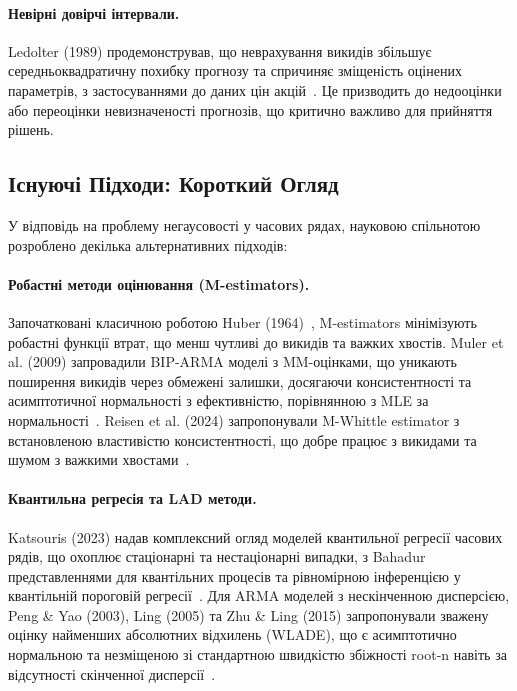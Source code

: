 \documentclass[12pt,a4paper]{article}
\begin{document}
	\paragraph{Невірні довірчі інтервали.} Ledolter (1989) продемонстрував, що неврахування викидів збільшує середньоквадратичну похибку прогнозу та спричиняє зміщеність оцінених параметрів, з застосуваннями до даних цін акцій~\cite{ledolter1989inference}. Це призводить до недооцінки або переоцінки невизначеності прогнозів, що критично важливо для прийняття рішень.
	
	\subsection{Існуючі Підходи: Короткий Огляд}
	\label{subsec:existing_approaches}
	
	У відповідь на проблему негаусовості у часових рядах, науковою спільнотою розроблено декілька альтернативних підходів:
	
	\paragraph{Робастні методи оцінювання (M-estimators).} Започатковані класичною роботою Huber (1964)~\cite{huber1964robust}, M-estimators мінімізують робастні функції втрат, що менш чутливі до викидів та важких хвостів. Muler et al. (2009) запровадили BIP-ARMA моделі з MM-оцінками, що уникають поширення викидів через обмежені залишки, досягаючи консистентності та асимптотичної нормальності з ефективністю, порівнянною з MLE за нормальності~\cite{muler2009robust}. Reisen et al. (2024) запропонували M-Whittle estimator з встановленою властивістю консистентності, що добре працює з викидами та шумом з важкими хвостами~\cite{reisen2024robust}.
	
	\paragraph{Квантильна регресія та LAD методи.} Katsouris (2023) надав комплексний огляд моделей квантильної регресії часових рядів, що охоплює стаціонарні та нестаціонарні випадки, з Bahadur представленнями для квантільних процесів та рівномірною інференцією у квантільній пороговій регресії~\cite{katsouris2023quantile}. Для ARMA моделей з нескінченною дисперсією, Peng \& Yao (2003), Ling (2005) та Zhu \& Ling (2015) запропонували зважену оцінку найменших абсолютних відхилень (WLADE), що є асимптотично нормальною та незміщеною зі стандартною швидкістю збіжності root-n навіть за відсутності скінченної дисперсії~\cite{peng2003least,ling2005self,zhu2015model}.
	
\end{document}
